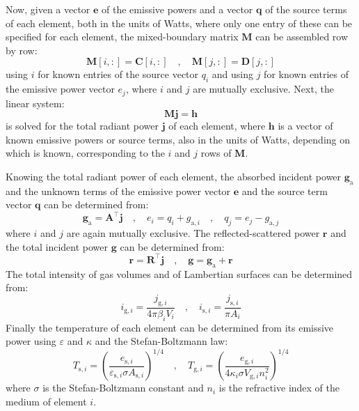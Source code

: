 \documentclass[preprint,1p,times]{elsarticle}
\theoremstyle{plain}
\theoremstyle{definition}
\theoremstyle{remark}
\begin{document}
Now, given a vector $\mathbf{e}$ of the emissive powers and a vector $\mathbf{q}$ of the source terms of each element, both in the units of Watts, where only one entry of these can be specified for each element, the mixed-boundary matrix $\mathbf{M}$ can be assembled row by row:
\begin{equation}
	\mathbf{M}[i,:] = \mathbf{C}[i,:] \quad , \quad \mathbf{M}[j,:] = \mathbf{D}[j,:]
\end{equation}
using $i$ for known entries of the source vector $q_i$ and using $j$ for known entries of the emissive power vector $e_j$, where $i$ and $j$ are mutually exclusive. Next, the linear system:
\begin{equation}
	\mathbf{M}\mathbf{j} = \mathbf{h}
	\label{eq:solve_for_j}
\end{equation}
is solved for the total radiant power $\mathbf{j}$ of each element, where $\mathbf{h}$ is a vector of known emissive powers or source terms, also in the units of Watts, depending on which is known, corresponding to the $i$ and $j$ rows of $\mathbf{M}$.

Knowing the total radiant power of each element, the absorbed incident power $\mathbf{g}_\mathrm{a}$ and the unknown terms of the emissive power vector $\mathbf{e}$ and the source term vector $\mathbf{q}$ can be determined from:
\begin{equation}
	\mathbf{g}_\mathrm{a} = \mathbf{A}^\top \mathbf{j} 
	\quad , \quad
	e_i = q_i + g_{\mathrm{a},i}
	\quad, \quad 
	q_j = e_j - g_{\mathrm{a},j}
	\label{eq:emissive_source}
\end{equation}
where $i$ and $j$ are again mutually exclusive. The reflected-scattered power $\mathbf{r}$ and the total incident power $\mathbf{g}$ can be determined from:
\begin{equation}
	\mathbf{r} = \mathbf{R}^\top \mathbf{j} \quad , \quad
	\mathbf{g} = \mathbf{g}_\mathrm{a} + \mathbf{r}
	\label{eq:r_and_g}
\end{equation}
The total intensity of gas volumes and of Lambertian surfaces can be determined from:
\begin{equation}
	i_{\mathrm{g},i} = \frac{j_{\mathrm{g},i}}{4\pi  \beta_i V_i} 
	\quad , \quad
	i_{\mathrm{s},i} = \frac{j_{\mathrm{s},i}}{\pi A_i}
\end{equation}
Finally the temperature of each element can be determined from its emissive power using $\varepsilon$ and $\kappa$ and the Stefan-Boltzmann law:
\begin{equation}
	T_{\mathrm{s},i} = \left( \frac{e_{\mathrm{s},i} }{ \varepsilon_{\mathrm{s},i}\sigma A_{\mathrm{s},i} }\right)^{1/4}
	\quad , \quad
	T_{\mathrm{g},i} = \left( \frac{e_{\mathrm{g},i} }{4 \kappa_i\sigma V_{\mathrm{g},i} n_i^2 }\right)^{1/4}	
\label{eq:temperature}
\end{equation}
where $\sigma$ is the Stefan-Boltzmann constant and $n_i$ is the refractive index of the medium of element $i$.
\end{document}
